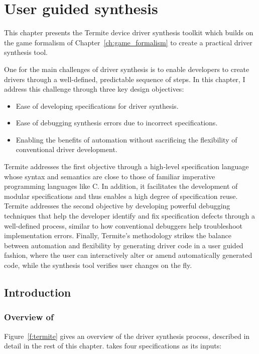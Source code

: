 \chapter{User guided synthesis}
\label{ch:userguided}

This chapter presents the Termite device driver synthesis toolkit which builds on the game formalism of Chapter~\ref{ch:game_formalism} to create a practical driver synthesis tool.

One for the main challenges of driver synthesis is to enable developers to create drivers through a well-defined, predictable sequence of steps. In this chapter, I address this challenge through three key design objectives:
\begin{itemize}
    \item Ease of developing specifications for driver synthesis.
    \item Ease of debugging synthesis errors due to incorrect specifications.
    \item Enabling the benefits of automation without sacrificing the flexibility of conventional driver development.  
\end{itemize}
    
Termite addresses the first objective through a high-level specification language whose syntax and semantics are close to those of familiar imperative programming languages like C.  In addition, it facilitates the development of modular specifications and thus enables a high degree of specification reuse. Termite addresses the second objective by developing powerful debugging techniques that help the developer identify and fix specification defects through a well-defined process, similar to how conventional debuggers help troubleshoot implementation errors.  Finally, Termite's methodology strikes the balance between automation and flexibility by generating driver code in a user guided fashion, where the user can interactively alter or amend automatically generated code, while the synthesis tool verifies user changes on the fly.

\section{Introduction}\label{sec:user_guided_intro}

\subsection{Overview of \termite} Figure~\ref{f:termite} gives an overview of the driver synthesis process, described in detail in the rest of this chapter.  \termite takes four specifications as its inputs: 

